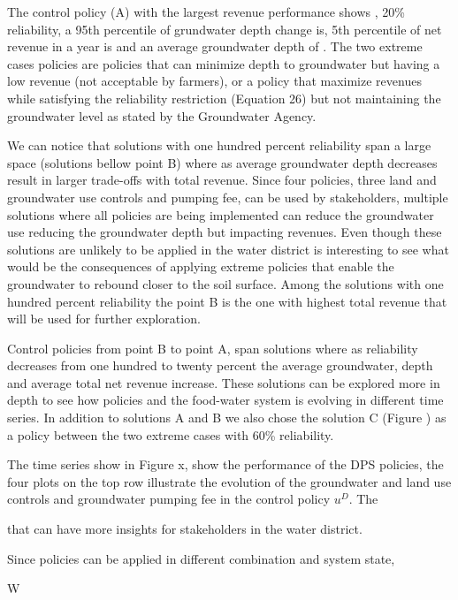 \documentclass[11pt,a4paper]{article}
\begin{document}

The control policy (A) with the largest revenue performance shows , 20\% reliability, a 95th percentile of grundwater depth change is,  5th percentile of net revenue in a year is and an average groundwater depth of .  The two extreme cases policies are policies that can minimize depth to groundwater but having a low revenue (not acceptable by farmers), or a policy that maximize revenues while satisfying the reliability restriction (Equation 26) but not maintaining the groundwater level as stated by the Groundwater Agency.

We can notice that solutions with one hundred percent reliability span a large space (solutions bellow point B) where as average groundwater depth decreases result in larger trade-offs with total revenue. Since four policies, three land and groundwater use controls and pumping fee, can be used by stakeholders, multiple solutions where all policies are being implemented can reduce the groundwater use reducing the groundwater depth but impacting revenues. Even though these solutions are unlikely to be applied in the water district is interesting to see what would be the consequences of applying extreme policies that enable the groundwater to rebound closer to the soil surface. Among the solutions with one hundred percent reliability the point B is the one with highest total revenue that will be used for further exploration. 

Control policies from point B to point A, span solutions where as reliability decreases from one hundred to twenty percent the average groundwater, depth and average total net revenue increase. These solutions can be explored more in depth to see how policies and the food-water system is evolving in different time series. In addition to solutions A and B we also chose the solution C (Figure ) as a policy between the two extreme cases with 60\% reliability. 

The time series show in Figure x, show the performance of the DPS policies, the four plots on the top row illustrate the evolution of the groundwater and land use controls and groundwater pumping fee in the control policy $u^{D}$. The 





that can have more insights for stakeholders in the water district. 

Since policies can be applied in different combination and system state, 


W
\end{document}
